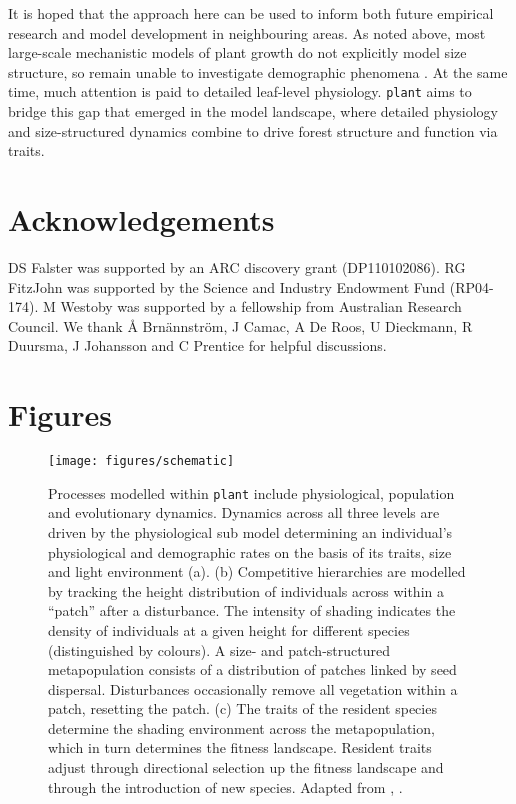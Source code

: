 \documentclass[a4paper,11pt]{article}
\newcommand{\plant}{\texttt{plant}}
\begin{document}
It is hoped that the approach here can be used to inform both future empirical
research and model development in neighbouring areas. As noted above, most
large-scale mechanistic models of plant growth do not explicitly model size
structure, so remain unable to investigate demographic phenomena
\citep{Cramer-2001, Sitch-2003, Dekauwe-2014}. At the same time,
much attention is paid to detailed leaf-level physiology. {\plant} aims to bridge
this gap that emerged in the model landscape, where detailed physiology and
size-structured dynamics combine to drive forest structure and function via
traits.

\section{Acknowledgements}

DS Falster was supported by an ARC discovery grant (DP110102086). RG
FitzJohn was supported by the Science and Industry Endowment Fund
(RP04-174). M Westoby was supported by a fellowship from Australian
Research Council. We thank {\AA} Brn{\"a}nnstr{\"o}m, J Camac, 
A De Roos, U Dieckmann, R Duursma, J Johansson and C Prentice 
for helpful discussions. 

\clearpage


\clearpage

\section{Figures}\label{figures}

\begin{figure}[h!]
\centering
\texttt{[image: figures/schematic]}

\caption{Processes modelled within {\plant} include physiological, population and
evolutionary dynamics.
Dynamics across all three levels are driven by the
physiological sub model determining an individual's physiological and
demographic rates on the basis of its traits, size and light environment (a).
(b) Competitive hierarchies  are modelled by tracking the height distribution of
individuals across within a ``patch'' after a disturbance. The intensity
of shading indicates the density of individuals at a given height for
different species (distinguished by colours). A size- and patch-structured
metapopulation consists of a distribution of patches linked by seed dispersal.
Disturbances occasionally remove all vegetation within a patch, resetting the
patch. (c) The traits of the resident species determine the shading environment
across the metapopulation, which in turn determines the fitness landscape.
Resident traits adjust through directional selection up the fitness landscape
and through the introduction of new species. Adapted from
\citet{Falster-2011}, \citet{Falster-2015}. }

\label{fig:schematic}
\end{figure}
\end{document}
